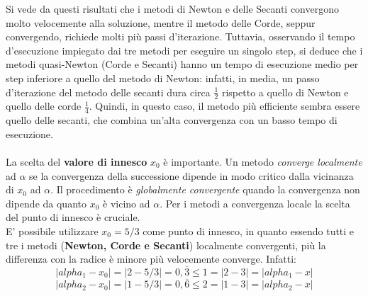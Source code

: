Si vede da questi risultati che i metodi di Newton e delle Secanti convergono molto velocemente alla soluzione, mentre il metodo delle Corde, seppur convergendo, richiede molti più passi d'iterazione. Tuttavia, osservando il tempo d'esecuzione impiegato dai tre metodi per eseguire un singolo step, si deduce che i metodi quasi-Newton (Corde e Secanti) hanno un tempo di esecuzione medio per step inferiore a quello del metodo di Newton: infatti, in media, un passo d'iterazione del metodo delle secanti dura circa $\frac{1}{2}$ rispetto a quello di Newton e quello delle corde $\frac{1}{4}$. Quindi, in questo caso, il metodo più efficiente sembra essere quello delle secanti, che combina un'alta convergenza con un basso tempo di esecuzione.\\\\
La scelta del \textbf{valore di innesco} $x_{0}$ è importante. Un metodo \textit{converge localmente} ad $\alpha$ se la convergenza della successione dipende in modo critico dalla vicinanza di $x_{0}$ ad $\alpha$. Il procedimento è \textit{globalmente convergente} quando la convergenza non dipende da quanto $x_{0}$ è vicino ad $\alpha$. Per i metodi a convergenza locale la scelta del punto di innesco è cruciale.\\
E' possibile utilizzare $x_{0}=5/3$ come punto di innesco, in quanto essendo tutti e tre i metodi (\textbf{Newton, Corde e Secanti}) localmente convergenti, più la differenza con la radice è minore più velocemente converge. Infatti:
	\[
	|alpha_1 - x_{0}| = |2 - 5/3| = 0,\overline{3} \leq 1 = |2 - 3| = |alpha_1 - x|
	\]
	\[
	|alpha_2 - x_{0}| = |1 - 5/3| = 0,\overline{6} \leq 2 = |1 - 3| = |alpha_2 - x|
	\]